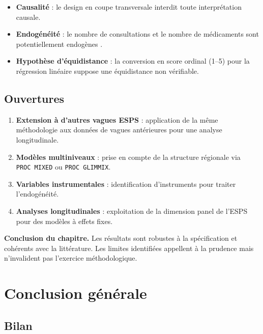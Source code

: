 \documentclass[11pt,a4paper]{memoirerecherche}
\providecommand{\tightlist}{%
  \setlength{\itemsep}{0pt}\setlength{\parskip}{0pt}}
\begin{document}
\begin{itemize}
\tightlist
\item
  \textbf{Causalité} : le design en coupe transversale interdit toute interprétation causale.
\item
  \textbf{Endogénéité} : le nombre de consultations et le nombre de médicaments sont potentiellement endogènes \autocite{grossman1972}.
\item
  \textbf{Hypothèse d'équidistance} : la conversion en score ordinal (1--5) pour la régression linéaire suppose une équidistance non vérifiable.
\end{itemize}

\hypertarget{ouvertures}{%
\subsection{Ouvertures}\label{ouvertures}}

\begin{enumerate}
\def\labelenumi{\arabic{enumi}.}
\tightlist
\item
  \textbf{Extension à d'autres vagues ESPS} : application de la même méthodologie aux données de vagues antérieures pour une analyse longitudinale.
\item
  \textbf{Modèles multiniveaux} : prise en compte de la structure régionale via \texttt{PROC\ MIXED} ou \texttt{PROC\ GLIMMIX}.
\item
  \textbf{Variables instrumentales} : identification d'instruments pour traiter l'endogénéité.
\item
  \textbf{Analyses longitudinales} : exploitation de la dimension panel de l'ESPS pour des modèles à effets fixes.
\end{enumerate}

\bigskip

\textbf{Conclusion du chapitre.} Les résultats sont robustes à la spécification et cohérents avec la littérature. Les limites identifiées appellent à la prudence mais n'invalident pas l'exercice méthodologique.

\newpage

\hypertarget{conclusion-guxe9nuxe9rale}{%
\section*{Conclusion générale}\label{conclusion-guxe9nuxe9rale}}

\hypertarget{bilan}{%
\subsection*{Bilan}\label{bilan}}
\end{document}
